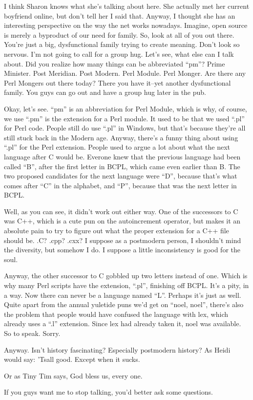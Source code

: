 \noindent I think Sharon knows what she's talking about here. She actually met her
current boyfriend online, but don't tell her I said that. Anyway, I thought
she has an interesting perspective on the way the net works nowadays.
Imagine, open source is merely a byproduct of our need for family. So, look
at all of you out there. You're just a big, dysfunctional family trying to
create meaning. Don't look so nervous. I'm not going to call for a group hug.
Let's see, what else can I talk about. Did you realize how many things can be
abbreviated ``pm''? Prime Minister. Post Meridian. Post Modern. Perl
Module. Perl Monger. Are there any Perl Mongers out there today? There you
have it--yet another dysfunctional family. You guys can go out and have a
group hug later in the pub.

Okay, let's see. ``pm'' is an abbreviation for Perl Module, which is why,
of course, we use ``.pm'' is the extension for a Perl module. It used to be
that we used ``.pl'' for Perl code. People still do use ``.pl'' in
Windows, but that's because they're all still stuck back in the Modern age.
Anyway, there's a funny thing about using ``.pl'' for the Perl extension.
People used to argue a lot about what the next language after C would be.
Everone knew that the previous language had been called ``B'', after the
first letter in BCPL, which came even earlier than B. The two proposed
candidates for the next language were ``D'', because that's what comes
after ``C'' in the alphabet, and ``P'', because that was the next letter
in BCPL.

Well, as you can see, it didn't work out either way. One of the successors to
C was C++, which is a cute pun on the autoincrement operator, but makes it an
absolute pain to try to figure out what the proper extension for a C++ file
should be. .C? .cpp? .cxx? I suppose as a postmodern person, I shouldn't mind
the diversity, but somehow I do. I suppose a little inconsistency is good for
the soul.

Anyway, the other successor to C gobbled up two letters instead of one. Which
is why many Perl scripts have the extension, ``.pl'', finishing off BCPL.
It's a pity, in a way. Now there can never be a language named ``L''.
Perhaps it's just as well. Quite apart from the annual yuletide puns we'd get
on ``noel, noel'', there's also the problem that people would have confused
the language with lex, which already uses a ``.l'' extension. Since lex had
already taken it, noel was available. So to speak. Sorry.

Anyway. Isn't history fascinating? Especially postmodern history? As Heidi
would say: 'Tsall good. Except when it sucks.

Or as Tiny Tim says, God bless us, every one.

If you guys want me to stop talking, you'd better ask some questions.

\bye
